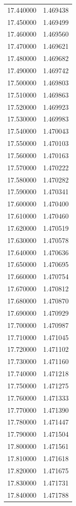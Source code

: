 \begin{tabular}{rr}
17.440000 & 1.469438 \\
17.450000 & 1.469499 \\
17.460000 & 1.469560 \\
17.470000 & 1.469621 \\
17.480000 & 1.469682 \\
17.490000 & 1.469742 \\
17.500000 & 1.469803 \\
17.510000 & 1.469863 \\
17.520000 & 1.469923 \\
17.530000 & 1.469983 \\
17.540000 & 1.470043 \\
17.550000 & 1.470103 \\
17.560000 & 1.470163 \\
17.570000 & 1.470222 \\
17.580000 & 1.470282 \\
17.590000 & 1.470341 \\
17.600000 & 1.470400 \\
17.610000 & 1.470460 \\
17.620000 & 1.470519 \\
17.630000 & 1.470578 \\
17.640000 & 1.470636 \\
17.650000 & 1.470695 \\
17.660000 & 1.470754 \\
17.670000 & 1.470812 \\
17.680000 & 1.470870 \\
17.690000 & 1.470929 \\
17.700000 & 1.470987 \\
17.710000 & 1.471045 \\
17.720000 & 1.471102 \\
17.730000 & 1.471160 \\
17.740000 & 1.471218 \\
17.750000 & 1.471275 \\
17.760000 & 1.471333 \\
17.770000 & 1.471390 \\
17.780000 & 1.471447 \\
17.790000 & 1.471504 \\
17.800000 & 1.471561 \\
17.810000 & 1.471618 \\
17.820000 & 1.471675 \\
17.830000 & 1.471731 \\
17.840000 & 1.471788 \\

\end{tabular}
